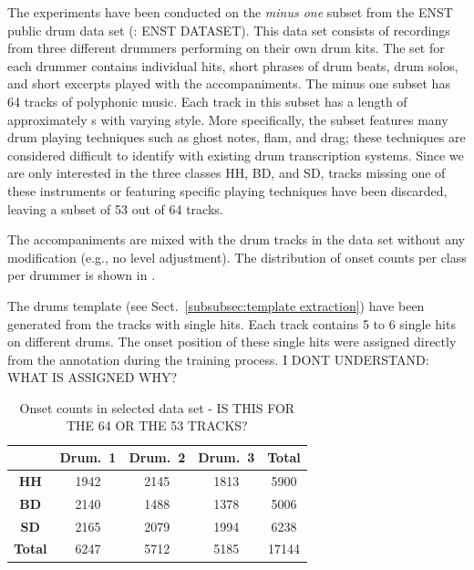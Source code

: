 \documentclass{article}
\begin{document}
The experiments have been conducted on the \textit{minus one} subset from the ENST public drum data set (\cite{}: ENST DATASET). This data set consists of recordings from three different drummers performing on their own drum kits. The set for each drummer contains individual hits, short phrases of drum beats, drum solos, and short excerpts played with the accompaniments. The minus one subset has 64 tracks of polyphonic music. Each track in this subset has a length of approximately \unit[70]{s} with varying style. More specifically, the subset features many drum playing techniques such as ghost notes, flam, and drag; these techniques are considered difficult to identify with existing drum transcription systems. Since we are only interested in the three classes HH, BD, and SD, tracks missing one of these instruments or featuring specific playing techniques have been discarded, leaving a subset of 53 out of 64 tracks.

The accompaniments are mixed with the drum tracks in the data set without any modification (e.g., no level adjustment). The distribution of onset counts per class per drummer is shown in . %

The drums template (see Sect.~\ref{subsubsec:template extraction}) have been generated from the tracks with single hits. Each track contains 5 to 6 single hits on different drums. The onset position of these single hits were assigned directly from the annotation during the training process.  I DONT UNDERSTAND: WHAT IS ASSIGNED WHY?
 
\begin{table}[h]
\begin{center}
\begin{tabular}{|c|c|c|c|c|}
\hline
 & \textbf{Drum.~1}    & \textbf{Drum.~2}    & \textbf{Drum.~3}    & \textbf{Total} \\ \hline
\textbf{HH}        & 1942 & 2145 & 1813 & 5900  \\ \hline
\textbf{BD}        & 2140 & 1488 & 1378 & 5006  \\ \hline
\textbf{SD}        & 2165 & 2079 & 1994 & 6238  \\ \hline
\textbf{Total}     & 6247 & 5712 & 5185 & 17144 \\ \hline
\end{tabular}
 \caption{Onset counts in selected data set - IS THIS FOR THE 64 OR THE 53 TRACKS?}
 \label{tab:onsetCount}
\end{center}
\end{table}
\end{document}
